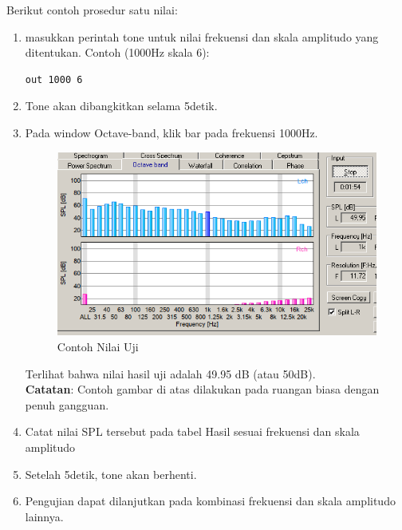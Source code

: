 \documentclass[12pt,]{article}
\begin{document}
	Berikut contoh prosedur satu nilai:
	\begin{enumerate}
		\item masukkan perintah tone untuk nilai frekuensi dan skala amplitudo yang ditentukan.
		Contoh (1000Hz skala 6):
		\begin{verbatim}
out 1000 6
		\end{verbatim}
		
		\item Tone akan dibangkitkan selama 5detik.
		
		\item Pada window Octave-band, klik bar pada frekuensi 1000Hz.
		
			\begin{figure}[!ht]
			\centering
			\includegraphics[width=300pt]{images/terminal/contoh}
			\caption{Contoh Nilai Uji}
		\end{figure}
	
		Terlihat bahwa nilai hasil uji adalah 49.95 dB (atau 50dB).\\
		\textbf{Catatan}: Contoh gambar di atas dilakukan pada ruangan biasa dengan penuh gangguan.
		
		\item Catat nilai SPL tersebut pada tabel Hasil sesuai frekuensi dan skala amplitudo
		
		\item Setelah 5detik, tone akan berhenti.
		
		\item Pengujian dapat dilanjutkan pada kombinasi frekuensi dan skala amplitudo lainnya.
	\end{enumerate}
	
\end{document}
